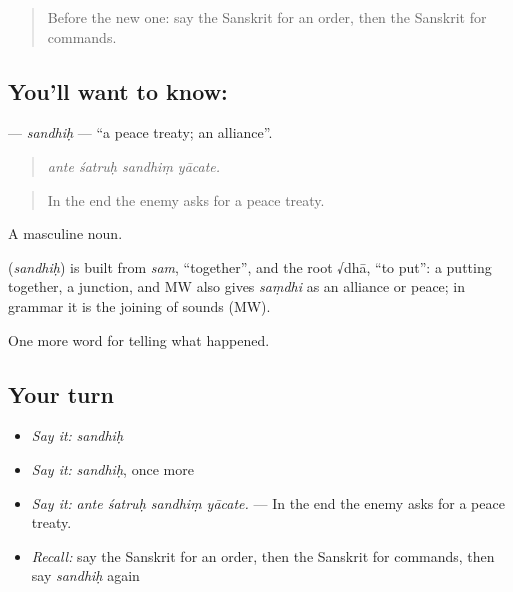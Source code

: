\label{lesson:SA-C317-sandhih}



\begin{quote}
Before the new one: say the Sanskrit for an order, then the Sanskrit for commands.
\end{quote}

\subsection*{You'll want to know: }
\textbf{} — \emph{sandhiḥ} — \textquotedblleft{}a peace treaty; an alliance\textquotedblright{}.

\begin{quote}
   
\end{quote}

\begin{quote}
\emph{ante śatruḥ sandhiṃ yācate.}
\end{quote}

\begin{quote}
In the end the enemy asks for a peace treaty.
\end{quote}

A masculine noun.

\begin{cousinweb}
\textbf{} (\emph{sandhiḥ}) is built from \emph{sam}, \textquotedblleft{}together\textquotedblright{}, and the root √dhā, \textquotedblleft{}to put\textquotedblright{}: a putting together, a junction, and MW also gives \emph{saṃdhi} as an alliance or peace; in grammar it is the joining of sounds (MW).
\end{cousinweb}

\begin{grammarlens}[title={What you've built}]
One more word for telling what happened.
\end{grammarlens}

\subsection*{Your turn}
\begin{itemize}
\raggedright
  \item \emph{Say it:} \emph{sandhiḥ}
  \item \emph{Say it:} \emph{sandhiḥ}, once more
  \item \emph{Say it:} \emph{ante śatruḥ sandhiṃ yācate.} — In the end the enemy asks for a peace treaty.
  \item \emph{Recall:} say the Sanskrit for an order, then the Sanskrit for commands, then say \emph{sandhiḥ} again
\end{itemize}

